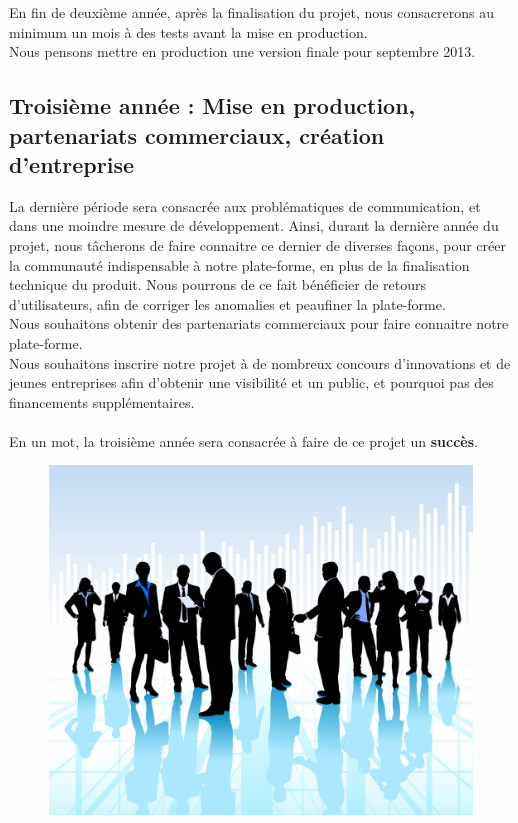 \documentclass{life-fr}
\begin{document}
En fin de deuxième année, après la finalisation du projet, nous consacrerons au minimum un mois à des tests avant la mise en production.\\
Nous pensons mettre en production une version finale pour septembre 2013.\\

\subsection{ Troisième année : Mise en production, partenariats commerciaux, création d'entreprise}

La dernière période sera consacrée aux problématiques de communication, et dans une moindre mesure de développement. Ainsi, durant la dernière année du projet, nous tâcherons de faire connaitre ce dernier de diverses façons, pour créer la communauté indispensable à notre plate-forme, en plus de la finalisation technique du produit. Nous pourrons de ce fait bénéficier de retours d'utilisateurs, afin de corriger les anomalies et peaufiner la plate-forme.\\
Nous souhaitons obtenir des partenariats commerciaux pour faire connaitre notre plate-forme.\\
Nous souhaitons inscrire notre projet à de nombreux concours d'innovations et de jeunes entreprises afin d'obtenir une visibilité et un public, et pourquoi pas des financements supplémentaires.\\
\\
En un mot, la troisième année sera consacrée à faire de ce projet un \textbf{succès}.

\begin{figure}[H]
  \begin{center}
    \includegraphics[width=12cm]{img/corporate.jpg}
  \end{center}
\end{figure}
\end{document}

